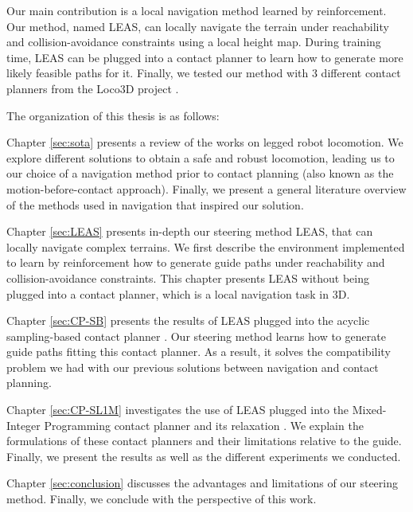Our main contribution is a local navigation method learned by reinforcement. 
Our method, named LEAS, can locally navigate the terrain under reachability and collision-avoidance constraints using a local height map.
During training time, LEAS can be plugged into a contact planner to learn how to generate more likely feasible paths for it.
Finally, we tested our method with 3 different contact planners from the Loco3D project \cite{loco3d}.

The organization of this thesis is as follows:

Chapter \ref{sec:sota} presents a review of the works on legged robot locomotion. 
We explore different solutions to obtain a safe and robust locomotion, leading us to our choice of a navigation method prior to contact planning (also known as the motion-before-contact approach). Finally, we present a general literature overview of the methods used in navigation that inspired our solution.

Chapter \ref{sec:LEAS} presents in-depth our steering method LEAS, that can locally navigate complex terrains.
We first describe the environment implemented to learn by reinforcement how to generate guide paths under reachability and collision-avoidance constraints.
This chapter presents LEAS without being plugged into a contact planner, which is a local navigation task in 3D.

Chapter \ref{sec:CP-SB} presents the results of LEAS plugged into the acyclic sampling-based contact planner \cite{AcyclicCP}. 
Our steering method learns how to generate guide paths fitting this contact planner. 
As a result, it solves the compatibility problem we had with our previous solutions between navigation and contact planning.

Chapter \ref{sec:CP-SL1M} investigates the use of LEAS plugged into the Mixed-Integer Programming contact planner and its relaxation \cite{sl1m_v2}. 
We explain the formulations of these contact planners and their limitations relative to the guide. Finally, we present the results as well as the different experiments we conducted.

Chapter \ref{sec:conclusion} discusses the advantages and limitations of our steering method. Finally, we conclude with the perspective of this work.